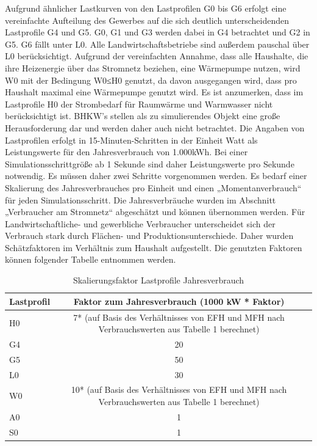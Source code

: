 Aufgrund ähnlicher Lastkurven von den Lastprofilen G0 bis G6 erfolgt eine vereinfachte Aufteilung des Gewerbes auf die sich deutlich unterscheidenden Lastprofile G4 und G5.
G0, G1 und G3 werden dabei in G4 betrachtet und G2 in G5. 
G6 fällt unter L0. 
Alle Landwirtschaftsbetriebe sind außerdem pauschal über L0 berücksichtigt. 
Aufgrund der vereinfachten Annahme, dass alle Haushalte, die ihre Heizenergie über das Stromnetz beziehen, eine Wärmepumpe nutzen, wird W0 mit der Bedingung W0≤H0 genutzt, da davon ausgegangen wird, dass pro Haushalt maximal eine Wärmepumpe genutzt wird. 
Es ist anzumerken, dass im Lastprofile H0 der Strombedarf für Raumwärme und Warmwasser nicht berücksichtigt ist. 
BHKW’s stellen als zu simulierendes Objekt eine große Herausforderung dar und werden daher auch nicht betrachtet.
Die Angaben von Lastprofilen erfolgt in 15-Minuten-Schritten in der Einheit Watt als Leistungswerte für den Jahresverbrauch von 1.000kWh. 
Bei einer Simulationsschrittgröße ab 1 Sekunde sind daher Leistungswerte pro Sekunde notwendig. 
Es müssen daher zwei Schritte vorgenommen werden. 
Es bedarf einer Skalierung des Jahresverbrauches pro Einheit und einen „Momentanverbrauch“ für jeden Simulationsschritt.
Die Jahresverbräuche wurden im Abschnitt „Verbraucher am Stromnetz“ abgeschätzt und können übernommen werden. 
Für Landwirtschaftliche- und gewerbliche Verbraucher unterscheidet sich der Verbrauch stark durch Flächen- und Produktionsunterschiede. 
Daher wurden Schätzfaktoren im Verhältnis zum Haushalt aufgestellt. Die genutzten Faktoren können folgender Tabelle entnommen werden.

\begin{table}[htbp]
    \centering
    \caption{Skalierungsfaktor Lastprofile Jahresverbrauch}
    \label{tab:skalierungsfaktor}
    \begin{tabular}{lcl}
        \toprule
        \textbf{Lastprofil} & \textbf{Faktor zum Jahresverbrauch (1000 kW * Faktor)} \\
        \midrule
        H0 & 7* (auf Basis des Verhältnisses von EFH und MFH nach Verbrauchswerten aus Tabelle 1 berechnet) \\
        G4 & 20 \\
        G5 & 50 \\
        L0 & 30 \\
        W0 & 10* (auf Basis des Verhältnisses von EFH und MFH nach Verbrauchswerten aus Tabelle 1 berechnet) \\
        A0 & 1 \\
        S0 & 1 \\
        \bottomrule
    \end{tabular}
\end{table}
    

